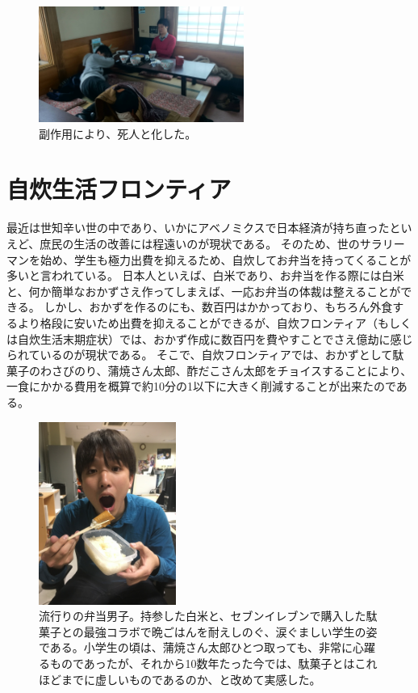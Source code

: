 \begin{figure}[h]
\centering
\includegraphics[width=0.6\textwidth]{./section/Shokuji/figures/Soba.jpg}
  \caption{副作用により、死人と化した。}
\label{Fig:Shigehisa}
\end{figure}

\section{自炊生活フロンティア}
最近は世知辛い世の中であり、いかにアベノミクスで日本経済が持ち直ったといえど、庶民の生活の改善には程遠いのが現状である。
そのため、世のサラリーマンを始め、学生も極力出費を抑えるため、自炊してお弁当を持ってくることが多いと言われている。
日本人といえば、白米であり、お弁当を作る際には白米と、何か簡単なおかずさえ作ってしまえば、一応お弁当の体裁は整えることができる。
しかし、おかずを作るのにも、数百円はかかっており、もちろん外食するより格段に安いため出費を抑えることができるが、自炊フロンティア（もしくは自炊生活末期症状）では、おかず作成に数百円を費やすことでさえ億劫に感じられているのが現状である。
そこで、自炊フロンティアでは、おかずとして駄菓子のわさびのり、蒲焼さん太郎、酢だこさん太郎をチョイスすることにより、一食にかかる費用を概算で約10分の1以下に大きく削減することが出来たのである。
\begin{figure}[h]
\centering
\includegraphics[width=0.4\textwidth]{./section/Shokuji/figures/JisuiMakki.jpg}
  \caption{流行りの弁当男子。持参した白米と、セブンイレブンで購入した駄菓子との最強コラボで晩ごはんを耐えしのぐ、涙ぐましい学生の姿である。小学生の頃は、蒲焼さん太郎ひとつ取っても、非常に心躍るものであったが、それから10数年たった今では、駄菓子とはこれほどまでに虚しいものであるのか、と改めて実感した。}
\label{Fig:Shigehisa}
\end{figure}


